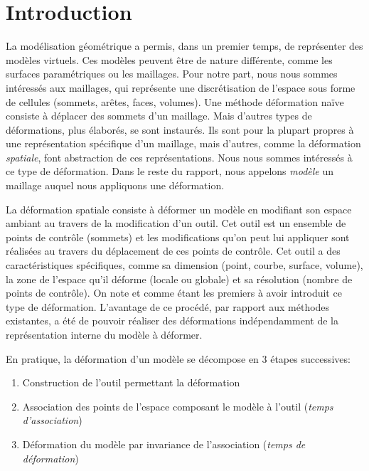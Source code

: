
\chapter{Introduction}

\graphicspath{ {Introduction/IntroductionFigs/PNG/}
  {Introduction/IntroductionFigs/PDF/}
  {Introduction/IntroductionFigs/} }

La modélisation géométrique a permis, dans un premier temps, de représenter
des modèles virtuels. Ces modèles peuvent être de nature différente, comme les
surfaces paramétriques ou les maillages. Pour notre part, nous nous sommes
intéressés aux maillages, qui représente une discrétisation de l'espace sous
forme de cellules (sommets, arêtes, faces, volumes). Une méthode déformation
naïve consiste à déplacer des sommets d'un maillage. Mais d'autres types de
déformations, plus élaborés, se sont instaurés. Ils sont pour la plupart
propres à une représentation spécifique d'un maillage, mais d'autres, comme la
déformation \textit{spatiale}, font abstraction de ces représentations. Nous
nous sommes intéressés à ce type de déformation. Dans le reste du rapport,
nous appelons \textit{modèle} un maillage auquel nous appliquons une
déformation.
	
La déformation spatiale consiste à déformer un modèle en modifiant son espace
ambiant au travers de la modification d'un outil. Cet outil est un ensemble de
points de contrôle (sommets) et les modifications qu'on peut lui appliquer
sont réalisées au travers du déplacement de ces points de contrôle. Cet outil
a des caractéristiques spécifiques, comme sa dimension (point, courbe,
surface, volume), la zone de l'espace qu'il déforme (locale ou globale) et sa
résolution (nombre de points de contrôle). On note \cite{Bar84} et \cite{SP86}
comme étant les premiers à avoir introduit ce type de déformation. L'avantage
de ce procédé, par rapport aux méthodes existantes, a été de pouvoir réaliser
des déformations indépendamment de la représentation interne du modèle à
déformer.

\newpage

En pratique, la déformation d'un modèle se décompose en 3 étapes successives:
\begin{enumerate}

\item Construction de l'outil permettant la déformation

\item Association des points de l'espace composant le modèle à l'outil
(\textit{temps d'association})

\item Déformation du modèle par invariance de l'association (\textit{temps de
déformation})

\end{enumerate} 

